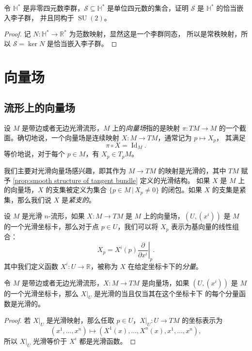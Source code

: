 \documentclass[fontset=none]{Notes}
\DeclareMathOperator\SU{SU}
\DeclareMathOperator\Id{Id}
\begin{document}
\begin{problem}{}{}
  令 $\mathbb{H}^*$ 是非零四元数李群，$\mathcal{S}\subseteq \mathbb{H}^*$
  是单位四元数的集合，证明 $\mathcal{S}$ 是 $\mathbb{H}^*$ 的恰当嵌入李子群，
  并且同构于 $\SU(2)$。
\end{problem}
\begin{proof}
  记 $N:\mathbb{H}^*\to \mathbb{R}^*$ 为范数映射，显然这是一个李群同态，
  所以是常秩映射，所以 $\mathcal{S}=\ker N$ 是恰当嵌入李子群。
\end{proof}



\chapter{向量场}

\section{流形上的向量场}

设 $M$ 是带边或者无边光滑流形，$M$ 上的\emph{向量场}指的是映射 $\pi:TM\to M$
的一个截面。确切地说，一个向量场是连续映射 $X:M\to TM$，通常记为 $p\mapsto X_p$，
其满足
\[
  \pi\circ X=\Id_M.
\]
等价地说，对于每个 $p\in M$，有 $X_p\in T_pM$。

我们主要对光滑向量场感兴趣，即其作为 $M\to TM$ 的映射是光滑的，其中 $TM$
赋予 \autoref{prop:smooth structure of tangent bundle} 定义的光滑结构。
如果 $X$ 是 $M$ 上的向量场，$X$ 的支集被定义为集合 $\{p\in M\,|\, X_p\neq 0\}$
的闭包。如果 $X$ 的支集是紧集，那么我们说 $X$ 是\emph{紧支的}。

设 $M$ 是光滑 $n$-流形，如果 $X:M\to TM$ 是 $M$ 上的向量场，$(U,(x^i))$
是 $M$ 的一个光滑坐标卡，那么对于点 $p\in U$，我们可以将 $X_p$
表示为基向量的线性组合：
\begin{equation}\label{eq:value of vector field}
  X_p=X^i(p)\left.\frac{\partial}{\partial x^i}\right|_p.
\end{equation}
其中我们定义函数 $X^i:U\to \mathbb{R}$，被称为 $X$ 在给定坐标卡下的\emph{分量}。

\begin{proposition}[向量场的光滑性判别]
  令 $M$ 是带边或者无边光滑流形，$X:M\to TM$ 是向量场，如果 $(U,(x^i))$
  是 $M$ 的一个光滑坐标卡，那么 $X|_U$ 是光滑的当且仅当其在这个坐标卡下
  的每个分量函数是光滑的。
\end{proposition}
\begin{proof}
  若 $X|_U$ 是光滑映射，那么任取 $p\in U$，$X|_U:U\to TM$ 的坐标表示为
  \[
    \left(x^1,\dots,x^n\right)\mapsto \left(X^1(x),\dots,X^n(x),x^1,\dots,x^n\right),
  \]
  所以 $X|_U$ 光滑等价于 $X^i$ 都是光滑函数。
\end{proof}
\end{document}
